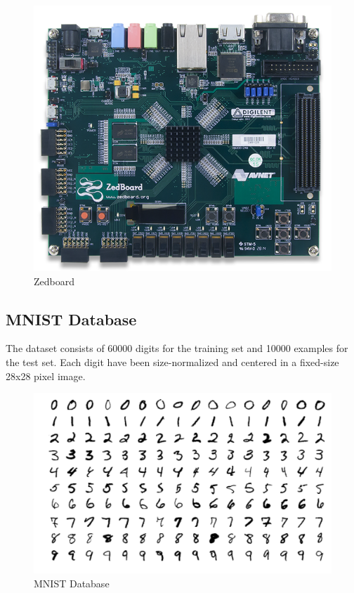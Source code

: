 \documentclass[12pt, a4paper, oneside]{article}
\begin{document}
	    	\begin{figure}[tbh!]
	    		\begin{center}
	    			\includegraphics[scale=2.5]{zedboard.png}
	    			\caption{Zedboard}
	    			\label{fig:Zedboad}
	    		\end{center}
	    	\end{figure}
    	
    	\subsection{MNIST Database}
    		The dataset consists of 60000 digits for the training set and 10000 examples for the test set. Each digit have been size-normalized and centered in a fixed-size 28x28 pixel image. 
    			\begin{figure}[tbh!]
    				\begin{center}
    					\includegraphics[scale=0.25]{MNIST.png}
    					\caption{MNIST Database}
    					\label{fig:MNIST Database}
    				\end{center}
    			\end{figure}
    		
\end{document}
